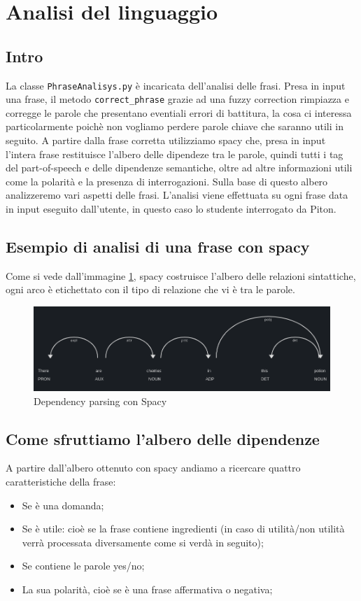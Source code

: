 \section{Analisi del linguaggio}
\subsection{Intro}
La classe \texttt{PhraseAnalisys.py} è incaricata dell'analisi delle frasi.
Presa in input una frase, il metodo \texttt{correct\_phrase} grazie ad una fuzzy correction rimpiazza e corregge le parole che presentano eventiali errori di battitura, la cosa ci interessa particolarmente poichè non vogliamo perdere parole chiave che saranno utili in seguito.
A partire dalla frase corretta  utilizziamo spacy che, presa in input l'intera frase restituisce l'albero delle dipendeze tra le parole, quindi tutti i tag del part-of-speech e delle dipendenze semantiche, oltre ad altre informazioni utili come la polarità e la presenza di interrogazioni. Sulla base di questo albero analizzeremo vari aspetti delle frasi. L'analisi viene effettuata su ogni frase data in input eseguito dall'utente, in questo caso lo studente interrogato da Piton.
\subsection{Esempio di analisi di una frase con spacy}
Come si vede dall'immagine \ref{fig:Spacy}, spacy costruisce l'albero delle relazioni sintattiche, ogni arco è etichettato con il tipo di relazione che vi è tra le parole.
\begin{figure}[h]
    \centering
    \includegraphics[scale=0.45]{Images/imgSpacy.png}
    \caption{Dependency parsing con Spacy}
    \label{fig:Spacy}
\end{figure}
\subsection{Come sfruttiamo l'albero delle dipendenze}
A partire dall'albero ottenuto con spacy andiamo a ricercare quattro caratteristiche della frase:
\begin{itemize}
    \item Se è una domanda;
    \item Se è utile: cioè se la frase contiene ingredienti (in caso di utilità/non utilità verrà processata diversamente come si verdà in seguito);
    \item Se contiene le parole yes/no;
    \item La sua polarità, cioè se è una frase affermativa o negativa;
\end{itemize}
